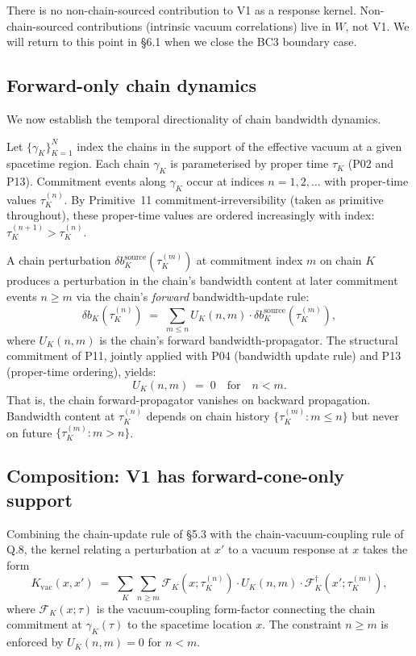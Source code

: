 \documentclass[11pt,a4paper]{article}
\begin{document}
There is no non-chain-sourced contribution to V1 as a response kernel. Non-chain-sourced contributions (intrinsic vacuum correlations) live in $W$, not V1. We will return to this point in \S6.1 when we close the BC3 boundary case.

\subsection{Forward-only chain dynamics}

We now establish the temporal directionality of chain bandwidth dynamics.

Let $\{\gamma_K\}_{K=1}^N$ index the chains in the support of the effective vacuum at a given spacetime region. Each chain $\gamma_K$ is parameterised by proper time $\tau_K$ (P02 and P13). Commitment events along $\gamma_K$ occur at indices $n = 1, 2, \ldots$ with proper-time values $\tau_K^{(n)}$. By Primitive~11 commitment-irreversibility (taken as primitive throughout), these proper-time values are ordered increasingly with index: $\tau_K^{(n+1)} > \tau_K^{(n)}$.

A chain perturbation $\delta b_K^\mathrm{source}(\tau_K^{(m)})$ at commitment index $m$ on chain $K$ produces a perturbation in the chain's bandwidth content at later commitment events $n \geq m$ via the chain's \emph{forward} bandwidth-update rule:
\[
\delta b_K(\tau_K^{(n)}) \;=\; \sum_{m \leq n} U_K(n, m) \cdot \delta b_K^\mathrm{source}(\tau_K^{(m)}),
\]
where $U_K(n, m)$ is the chain's forward bandwidth-propagator. The structural commitment of P11, jointly applied with P04 (bandwidth update rule) and P13 (proper-time ordering), yields:
\[
U_K(n, m) \;=\; 0 \quad \text{for} \quad n < m.
\]
That is, the chain forward-propagator vanishes on backward propagation. Bandwidth content at $\tau_K^{(n)}$ depends on chain history $\{\tau_K^{(m)} : m \leq n\}$ but never on future $\{\tau_K^{(m)} : m > n\}$.

\subsection{Composition: V1 has forward-cone-only support}

Combining the chain-update rule of \S5.3 with the chain-vacuum-coupling rule of Q.8, the kernel relating a perturbation at $x'$ to a vacuum response at $x$ takes the form
\[
K_\mathrm{vac}(x, x') \;=\; \sum_{K} \sum_{n \geq m} \mathcal{F}_K(x; \tau_K^{(n)}) \cdot U_K(n, m) \cdot \mathcal{F}_K^\dagger(x'; \tau_K^{(m)}),
\]
where $\mathcal{F}_K(x; \tau)$ is the vacuum-coupling form-factor connecting the chain commitment at $\gamma_K(\tau)$ to the spacetime location $x$. The constraint $n \geq m$ is enforced by $U_K(n, m) = 0$ for $n < m$.
\end{document}

